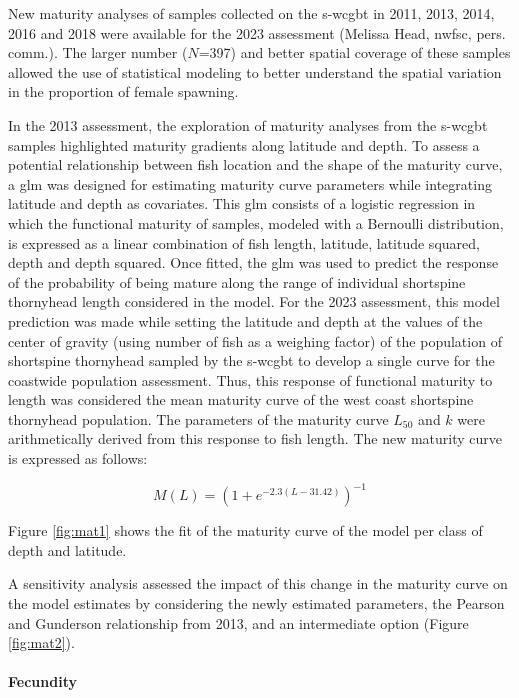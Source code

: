 \documentclass[11pt,
  english,
  letterpaper,
]{article}
\begin{document}
New maturity analyses of samples collected on the \gls{s-wcgbt} in 2011, 2013, 2014, 2016 and 2018 were available for the 2023 assessment (Melissa Head, \gls{nwfsc}, pers. comm.). The larger number (\(N\)=397) and better spatial coverage of these samples allowed the use of statistical modeling to better understand the spatial variation in the proportion of female spawning.

In the 2013 assessment, the exploration of maturity analyses from the \gls{s-wcgbt} samples highlighted maturity gradients along latitude and depth. To assess a potential relationship between fish location and the shape of the maturity curve, a \gls{glm} was designed for estimating maturity curve parameters while integrating latitude and depth as covariates. This \gls{glm} consists of a logistic regression in which the functional maturity of samples, modeled with a Bernoulli distribution, is expressed as a linear combination of fish length, latitude, latitude squared, depth and depth squared. Once fitted, the \gls{glm} was used to predict the response of the probability of being mature along the range of individual shortspine thornyhead length considered in the model. For the 2023 assessment, this model prediction was made while setting the latitude and depth at the values of the center of gravity (using number of fish as a weighing factor) of the population of shortspine thornyhead sampled by the \gls{s-wcgbt} to develop a single curve for the coastwide population assessment. Thus, this response of functional maturity to length was considered the mean maturity curve of the west coast shortspine thornyhead population. The parameters of the maturity curve \(L_{50}\) and \(k\) were arithmetically derived from this response to fish length. The new maturity curve is expressed as follows:

\begin{equation} M(L) = (1+e^{-2.3(L-31.42)})^{-1}\end{equation}

Figure \ref{fig:mat1} shows the fit of the maturity curve of the model per class of depth and latitude.

A sensitivity analysis assessed the impact of this change in the maturity curve on the model estimates by considering the newly estimated parameters, the Pearson and Gunderson relationship from 2013, and an intermediate option (Figure \ref{fig:mat2}).

\hypertarget{fecundity}{%
\paragraph{Fecundity}\label{fecundity}}
\end{document}
